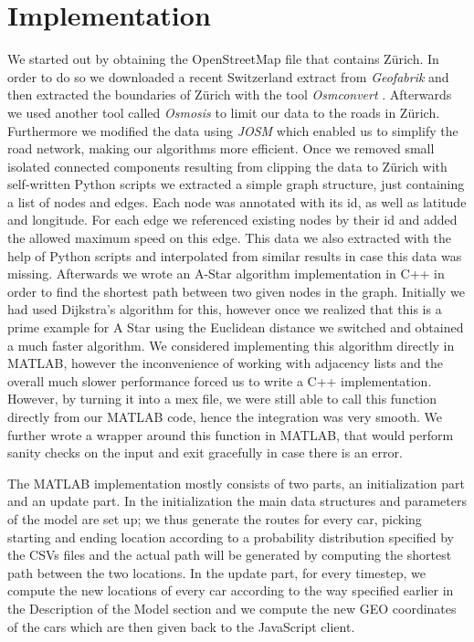 \documentclass[11pt]{article}
\begin{document}
\section{Implementation}
We started out by obtaining the OpenStreetMap\cite{osm} file that contains Z\"urich.
In order to do so we downloaded a recent Switzerland extract from \emph{Geofabrik} \cite{geofab} and then extracted the boundaries of Z\"urich with the tool \emph{Osmconvert} \cite{osmconv}.
Afterwards we used another tool called \emph{Osmosis}\cite{oosmosis} to limit our data to the roads in Z\"urich.
Furthermore we modified the data using \emph{JOSM}\cite{JOSM} which enabled us to simplify the road network, making our algorithms more efficient.
Once we removed small isolated connected components resulting from clipping the data to Z\"urich with self-written Python scripts
we extracted a simple graph structure, just containing a list of nodes and edges.
Each node was annotated with its id, as well as latitude and longitude.
For each edge we referenced existing nodes by their id and added the allowed maximum speed on this edge.
This data we also extracted with the help of Python scripts and interpolated from similar results in case this data was missing.
Afterwards we wrote an A-Star algorithm implementation in C++ in order to find the shortest path between two given nodes in the graph.
Initially we had used Dijkstra's algorithm for this, however once we realized that this is a prime example for A Star using the Euclidean distance we switched and obtained a much faster algorithm.
We considered implementing this algorithm directly in MATLAB, however the inconvenience of working with adjacency lists and the overall much slower performance forced us to write a C++ implementation.
However, by turning it into a mex file, we were still able to call this function directly from our MATLAB code, hence the integration was very smooth.
We further wrote a wrapper around this function in MATLAB, that would perform sanity checks on the input and exit gracefully in case there is an error.

The MATLAB implementation mostly consists of two parts, an initialization part and an update part. In the initialization the main data structures and parameters of the model are set up; we thus generate the routes for every car, picking starting and ending location according to a probability distribution specified by the CSVs files and the actual path will be generated by computing the shortest path between the two locations. In the update part, for every timestep, we compute the new locations of every car according to the way specified earlier in the Description of the Model section and we compute the new GEO coordinates of the cars which are then given back to the JavaScript client.
\end{document}
